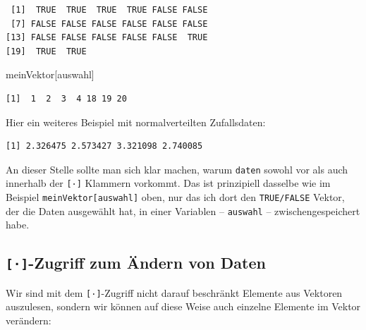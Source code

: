 \documentclass[12pt,]{tufte-book}
\newenvironment{Shaded}{\begin{snugshade}}{\end{snugshade}}
\newcommand{\KeywordTok}[1]{\textcolor[rgb]{0.13,0.29,0.53}{\textbf{#1}}}
\newcommand{\DecValTok}[1]{\textcolor[rgb]{0.00,0.00,0.81}{#1}}
\newcommand{\StringTok}[1]{\textcolor[rgb]{0.31,0.60,0.02}{#1}}
\newcommand{\OperatorTok}[1]{\textcolor[rgb]{0.81,0.36,0.00}{\textbf{#1}}}
\newcommand{\NormalTok}[1]{#1}
\theoremstyle{definition}
\theoremstyle{definition}
\theoremstyle{definition}
\theoremstyle{remark}
\begin{document}
\begin{verbatim}
 [1]  TRUE  TRUE  TRUE  TRUE FALSE FALSE
 [7] FALSE FALSE FALSE FALSE FALSE FALSE
[13] FALSE FALSE FALSE FALSE FALSE  TRUE
[19]  TRUE  TRUE
\end{verbatim}

\begin{Shaded}
\begin{Highlighting}[]
\NormalTok{meinVektor[auswahl]}
\end{Highlighting}
\end{Shaded}

\begin{verbatim}
[1]  1  2  3  4 18 19 20
\end{verbatim}

Hier ein weiteres Beispiel mit normalverteilten Zufallsdaten:

\begin{Shaded}
\end{Shaded}

\begin{verbatim}
[1] 2.326475 2.573427 3.321098 2.740085
\end{verbatim}

An dieser Stelle sollte man sich klar machen, warum \texttt{daten}
sowohl vor als auch innerhalb der \texttt{{[}·{]}} Klammern vorkommt.
Das ist prinzipiell dasselbe wie im Beispiel
\texttt{meinVektor{[}auswahl{]}} oben, nur das ich dort den
\texttt{TRUE/FALSE} Vektor, der die Daten ausgewählt hat, in einer
Variablen -- \texttt{auswahl} -- zwischengespeichert habe.

\hypertarget{vektorAendern}{\subsection{\texorpdfstring{\texttt{{[}·{]}}-Zugriff
zum Ändern von
Daten}{{[}·{]}-Zugriff zum Ändern von Daten}}\label{vektorAendern}}

Wir sind mit dem \texttt{{[}·{]}}-Zugriff nicht darauf beschränkt
Elemente aus Vektoren auszulesen, sondern wir können auf diese Weise
auch einzelne Elemente im Vektor verändern:
\end{document}

